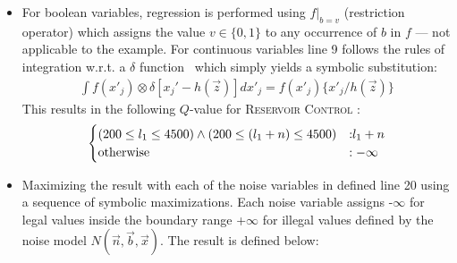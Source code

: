 \documentclass[letterpaper]{article}
\begin{document}
\begin{itemize}
\item For boolean variables, regression is performed using $f|_{b=v}$ (restriction operator) which assigns the value $v \in \{ 0,1 \}$ to any occurrence of $b$ in $f$ --- not applicable to the example. For continuous variables line 9 follows the rules of integration w.r.t. a $\delta$ function~\cite{sanner_uai11} which simply yields a symbolic substitution: 
{\footnotesize
\begin{align}
\int f(x'_j) \otimes \delta[x_j' - h(\vec{z})] dx'_j = f(x'_j) \{ x'_j / h(\vec{z}) \}\nonumber
\end{align}}
This results in the following $Q$-value for \textsc{Reservoir Control} : 
{\footnotesize
\begin{align*}
\begin{cases}
(200 \leq l_1 \leq 4500) \wedge (200 \leq (l_1 + n) \leq 4500) &: \hspace{-1mm} l_1 + n\\
\text{otherwise} &: -\infty\\
\end{cases}
\end{align*}
}
\item Maximizing the result with each of the noise variables in defined line 20 using a sequence of symbolic maximizations. Each noise variable assigns -$\infty$ for legal values inside the boundary range +$\infty$ for illegal values defined by the noise model $N(\vec{n},\vec{b},\vec{x})$. The result is defined below:

\end{itemize}
\end{document}
